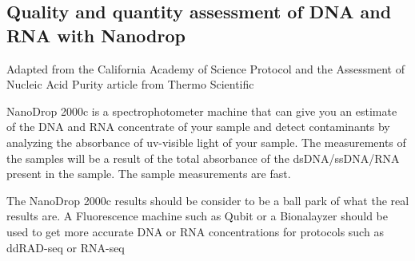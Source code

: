 \documentclass[11pt, oneside]{article}
\begin{document}
	\newpage

	\subsection{Quality and quantity assessment of DNA and RNA with Nanodrop}
	
		\begin{adjustwidth}{0.25in}{0pt} Adapted from the California Academy of Science Protocol and the Assessment of Nucleic Acid Purity article from 		Thermo Scientific \end{adjustwidth}
		
		\vspace{4mm}
	
		\noindent NanoDrop 2000c is a spectrophotometer machine that can give you an estimate of the DNA and RNA concentrate of your sample and 		detect contaminants by analyzing the absorbance of uv-visible light of your sample. The measurements of the samples will be a result of the total 		absorbance of the dsDNA/ssDNA/RNA present in the sample. The sample measurements are fast.
	
		\noindent The NanoDrop 2000c results should be consider to be a ball park of what the real results are.  A Fluorescence machine such as Qubit or 		a Bionalayzer should be used to get more accurate DNA or RNA concentrations for protocols such as ddRAD-seq or RNA-seq 
	
		\vspace{5mm}
	
\end{document}
